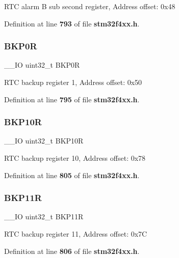 R\+TC alarm B sub second register, Address offset\+: 0x48 

Definition at line \textbf{ 793} of file \textbf{ stm32f4xx.\+h}.

\mbox{\label{structRTC__TypeDef_a4808ec597e5a5fefd8a83a9127dd1aec}} 
\subsubsection{B\+K\+P0R}
{\footnotesize\ttfamily \+\_\+\+\_\+\+IO uint32\+\_\+t B\+K\+P0R}

R\+TC backup register 1, Address offset\+: 0x50 

Definition at line \textbf{ 795} of file \textbf{ stm32f4xx.\+h}.

\mbox{\label{structRTC__TypeDef_aade2881a3e408bfd106b27f78bbbcfc9}} 
\subsubsection{B\+K\+P10R}
{\footnotesize\ttfamily \+\_\+\+\_\+\+IO uint32\+\_\+t B\+K\+P10R}

R\+TC backup register 10, Address offset\+: 0x78 

Definition at line \textbf{ 805} of file \textbf{ stm32f4xx.\+h}.

\mbox{\label{structRTC__TypeDef_ac66d5e2d3459cff89794c47dbc8f7228}} 
\subsubsection{B\+K\+P11R}
{\footnotesize\ttfamily \+\_\+\+\_\+\+IO uint32\+\_\+t B\+K\+P11R}

R\+TC backup register 11, Address offset\+: 0x7C 

Definition at line \textbf{ 806} of file \textbf{ stm32f4xx.\+h}.

\mbox{\label{structRTC__TypeDef_a6f7eee5ae8a32c07f9c8fe14281bdaf3}} 
